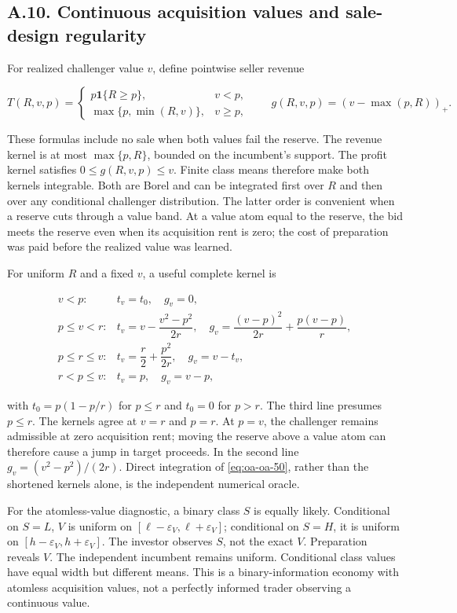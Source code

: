 \documentclass[
  11pt,
]{article}
\begin{document}
\subsection{A.10. Continuous acquisition values and sale-design
regularity}\label{oa-a-design}

For realized challenger value \(v\), define pointwise seller revenue

\[
T(R,v,p)=
\begin{cases}
p\mathbf1\{R\ge p\},&v<p,\\
\max\{p,\min(R,v)\},&v\ge p,
\end{cases}
\qquad
g(R,v,p)=(v-\max(p,R))_+.
\tag{OA.50}\label{eq:oa-oa-50}
\]

These formulas include no sale when both values fail the reserve. The
revenue kernel is at most \(\max\{p,R\}\), bounded on the incumbent's
support. The profit kernel satisfies \(0\le g(R,v,p)\le v\). Finite class
means therefore make both kernels integrable. Both are Borel and can be
integrated first over \(R\) and then over any conditional challenger
distribution. The latter order is convenient
when a reserve cuts through a value band. At a value atom equal to the
reserve, the bid meets the reserve even when its acquisition rent is
zero; the cost of preparation was paid before the realized value was
learned.

For uniform \(R\) and a fixed \(v\), a useful complete kernel is

\[
\begin{array}{ll}
v<p:&t_v=t_0,\quad g_v=0,\\
p\le v<r:&t_v=v-\dfrac{v^2-p^2}{2r},\quad g_v=\dfrac{(v-p)^2}{2r}+\dfrac{p(v-p)}r,\\
p\le r\le v:&t_v=\dfrac r2+\dfrac{p^2}{2r},\quad g_v=v-t_v,\\
r<p\le v:&t_v=p,\quad g_v=v-p,
\end{array}
\tag{OA.51}\label{eq:oa-oa-51}
\]

with \(t_0=p(1-p/r)\) for \(p\le r\) and \(t_0=0\) for \(p>r\). The
third line presumes \(p\le r\). The kernels agree at \(v=r\) and
\(p=r\). At \(p=v\), the challenger remains admissible at zero
acquisition rent; moving the reserve above a value atom can therefore
cause a jump in target proceeds. In the second line
\(g_v=(v^2-p^2)/(2r)\). Direct integration of \eqref{eq:oa-oa-50},
rather than the shortened kernels alone, is the independent numerical
oracle.

For the atomless-value diagnostic, a binary class \(S\) is equally
likely. Conditional on \(S=L\), \(V\) is uniform on
\([\ell-\varepsilon_V,\ell+\varepsilon_V]\); conditional on \(S=H\), it
is uniform on \([h-\varepsilon_V,h+\varepsilon_V]\). The investor
observes \(S\), not the exact \(V\). Preparation reveals \(V\). The
independent incumbent remains uniform. Conditional class values have
equal width but different means. This is a binary-information economy
with atomless acquisition values, not a perfectly informed trader
observing a continuous value.
\end{document}
